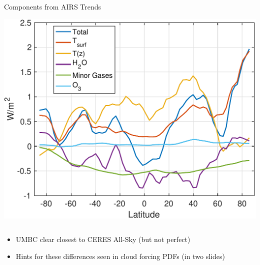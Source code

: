 \documentclass[10pt,t]{beamer}
\begin{document}
\begin{frame}
\begin{columns}
\begin{column}{0.5\columnwidth}
\begin{block}{\small Components from AIRS Trends}
\vspace{-0.1in}
\begin{center}
\includegraphics[width=\linewidth]{SunClimate2022/umbc_olr_components.pdf}
\end{center}
\end{block}
\end{column}
\end{columns}

\vspace{-0.05in}

\begin{itemize}
\item UMBC clear closest to CERES All-Sky (but not perfect)
\item Hints for these differences seen in cloud forcing PDFs (in two slides)
\end{itemize}
\end{frame}
\end{document}
